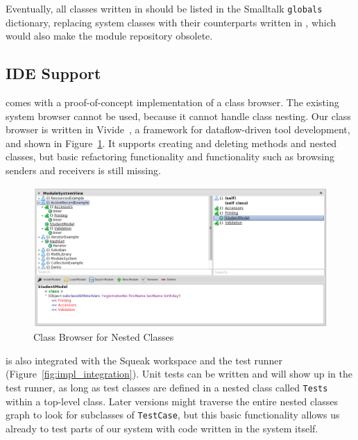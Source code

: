 Eventually, all classes written in \msname should be listed in the Smalltalk \texttt{globals} dictionary, replacing system classes with their counterparts written in \msname, which would also make the module repository obsolete.

\subsection{IDE Support}
\msname comes with a proof-of-concept implementation of a class browser. The existing system browser cannot be used, because it cannot handle class nesting. Our class browser is written in Vivide~\cite{Taeumel:2012:VPE:2384592.2384604}, a framework for dataflow-driven tool development, and shown in Figure~\ref{fig:impl_class_browser}. It supports creating and deleting methods and nested classes, but basic refactoring functionality and functionality such as browsing senders and receivers is still missing.

\begin{figure}[!htp]
	\centering
	\includegraphics[width=\textwidth]{screenshot_classbrowser.png}
	\caption{Class Browser for Nested Classes}
	\label{fig:impl_class_browser}
\end{figure}

\msname is also integrated with the Squeak workspace and the test runner (Figure~\ref{fig:impl_integration}). Unit tests can be written and will show up in the test runner, as long as test classes are defined in a nested class called \texttt{Tests} within a top-level class. Later versions might traverse the entire nested classes graph to look for subclasses of \texttt{TestCase}, but this basic functionality allows us already to test parts of our system with code written in the system itself.

